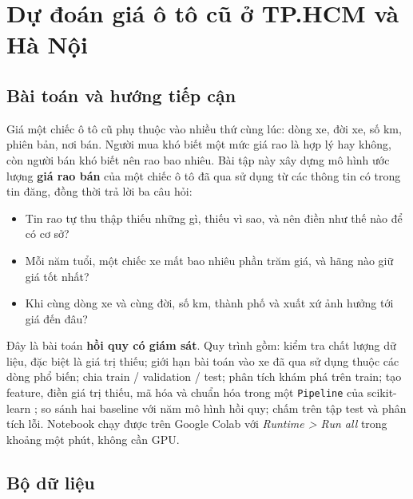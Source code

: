 \chapter[Dự đoán giá ô tô cũ]{Dự đoán giá ô tô cũ ở TP.HCM và Hà Nội}
\setlength{\emergencystretch}{3em}

\section{Bài toán và hướng tiếp cận}

Giá một chiếc ô tô cũ phụ thuộc vào nhiều thứ cùng lúc: dòng xe, đời xe, số km, phiên bản, nơi bán. Người mua khó biết
một mức giá rao là hợp lý hay không, còn người bán khó biết nên rao bao nhiêu. Bài tập này xây dựng mô hình ước lượng
\textbf{giá rao bán} của một chiếc ô tô đã qua sử dụng từ các thông tin có trong tin đăng, đồng thời trả lời ba câu hỏi:

\begin{itemize}
  \item Tin rao tự thu thập thiếu những gì, thiếu vì sao, và nên điền như thế nào để có cơ sở?
  \item Mỗi năm tuổi, một chiếc xe mất bao nhiêu phần trăm giá, và hãng nào giữ giá tốt nhất?
  \item Khi cùng dòng xe và cùng đời, số km, thành phố và xuất xứ ảnh hưởng tới giá đến đâu?
\end{itemize}

Đây là bài toán \textbf{hồi quy có giám sát}. Quy trình gồm: kiểm tra chất lượng dữ liệu, đặc biệt là giá trị thiếu;
giới hạn bài toán vào xe đã qua sử dụng thuộc các dòng phổ biến; chia train / validation / test; phân tích khám phá trên
train; tạo feature, điền giá trị thiếu, mã hóa và chuẩn hóa trong một \texttt{Pipeline} của scikit-learn
\cite{tab-sklearn}; so sánh hai baseline với năm mô hình hồi quy; chấm trên tập test và phân tích lỗi. Notebook chạy
được trên Google Colab với \textit{Runtime > Run all} trong khoảng một phút, không cần GPU.

\section{Bộ dữ liệu}

